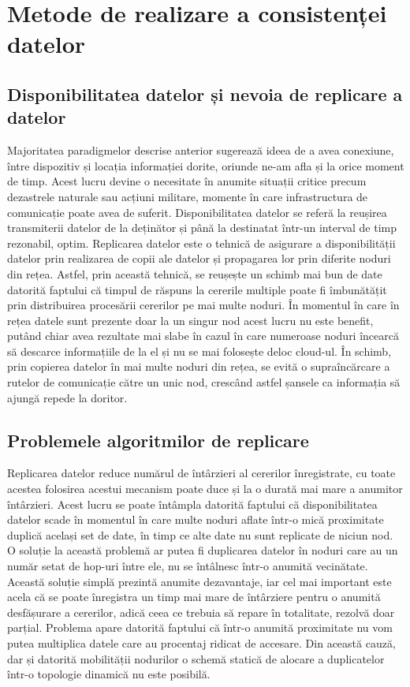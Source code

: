 \documentclass[12pt,a4paper]{report}
\begin{document}
\section{Metode de realizare a consistenței datelor} \label{metodeExistenteConsistenta}
\subsection{Disponibilitatea datelor și nevoia de replicare a datelor}
Majoritatea paradigmelor descrise anterior sugerează ideea de a avea conexiune, între dispozitiv și locația informației dorite, oriunde ne-am afla și la orice moment de timp. Acest lucru devine o necesitate în anumite situații critice precum dezastrele naturale sau acțiuni militare, momente în care infrastructura de comunicație poate avea de suferit. Disponibilitatea datelor se referă la reușirea transmiterii datelor de la deținător și până la destinatat într-un interval de timp rezonabil, optim. Replicarea datelor este o tehnică de asigurare a disponibilității datelor prin realizarea de copii ale datelor și propagarea lor prin diferite noduri din rețea. Astfel, prin această tehnică, se reușește un schimb mai bun de date datorită faptului că timpul de răspuns la cererile multiple poate fi îmbunătățit prin distribuirea procesării cererilor pe mai multe noduri. În momentul în care în rețea datele sunt prezente doar la un singur nod acest lucru nu este benefit, putând chiar avea rezultate mai slabe în cazul în care numeroase noduri încearcă să descarce informațiile de la el și nu se mai folosește deloc cloud-ul. În schimb, prin copierea datelor în mai multe noduri din rețea, se evită o supraîncărcare a rutelor de comunicație către un unic nod, crescând astfel șansele ca informația să ajungă repede la doritor. 
\subsection{Problemele algoritmilor de replicare}
Replicarea datelor reduce numărul de întârzieri al cererilor înregistrate, cu toate acestea folosirea acestui mecanism poate duce și la o durată mai mare a anumitor întârzieri. Acest lucru se poate întâmpla datorită faptului că disponibilitatea datelor scade în momentul în care multe noduri aflate într-o mică proximitate duplică același set de date, în timp ce alte date nu sunt replicate de niciun nod. O soluție la această problemă ar putea fi duplicarea datelor în noduri care au un număr setat de hop-uri între ele, nu se întâlnesc într-o anumită vecinătate. Această soluție simplă prezintă anumite dezavantaje, iar cel mai important este acela că se poate înregistra un timp mai mare de întârziere pentru o anumită desfășurare a cererilor, adică ceea ce trebuia să repare în totalitate, rezolvă doar parțial. Problema apare datorită faptului că într-o anumită proximitate nu vom putea multiplica datele care au procentaj ridicat de accesare. Din această cauză, dar și datorită mobilității nodurilor o schemă statică de alocare a duplicatelor într-o topologie dinamică nu este posibilă.
\end{document}

